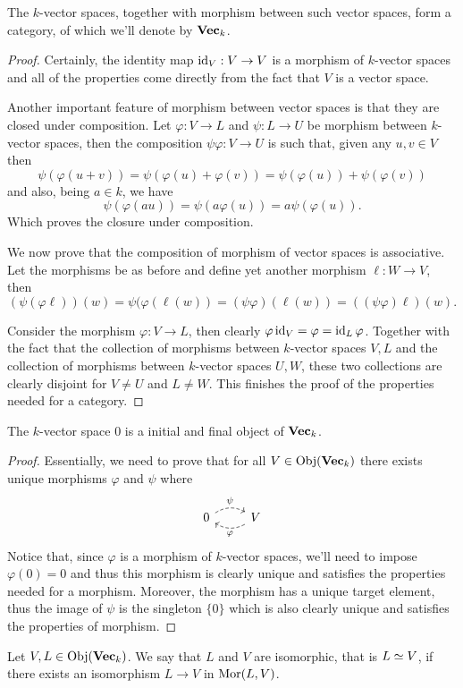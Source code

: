 \begin{proposition}\label{prop: category of vector spaces}
The \(k\)-vector spaces, together with morphism between such vector spaces,
form a category, of which we'll denote by \({\textbf{Vec}}_k\).
\end{proposition}

\begin{proof}
Certainly, the identity map \(\operatorname{id}_V : V \to V\) is a morphism of \(k\)-vector
spaces and all of the properties come directly from the fact that \(V\) is a
vector space.

Another important feature of morphism between vector spaces is that they are
closed under composition. Let \(\varphi : V \to L\) and \(\psi : L \to U\) be
morphism between \(k\)-vector spaces, then the composition \(\psi
\varphi : V \to U\) is such that, given any \(u, v \in V\) then
\[
  \psi(\varphi(u+v)) = \psi(\varphi(u) + \varphi(v)) = \psi(\varphi(u)) +
  \psi(\varphi(v))
\]
and also, being \(a \in k\), we have
\[
  \psi(\varphi(au)) = \psi(a\varphi(u)) = a \psi(\varphi(u)).
\]
Which proves the closure under composition.

We now prove that the composition of morphism of vector spaces is
associative. Let the morphisms be as before and define yet another morphism
\(\ell : W \to V\), then
\[
  (\psi  (\varphi  \ell)) (w) = \psi(\varphi(\ell(w)) = (\psi
  \varphi)(\ell(w)) = ((\psi  \varphi)  \ell) (w).
\]

Consider the morphism \(\varphi : V \to L\), then clearly \(\varphi
\operatorname{id}_V = \varphi = \operatorname{id}_L  \varphi\). Together with the fact that the
collection of morphisms between \(k\)-vector spaces \(V, L\) and the
collection of morphisms between \(k\)-vector spaces \(U, W\), these two
collections are clearly disjoint for \(V \neq U\) and \(L \neq W\). This
finishes the proof of the properties needed for a category.
\end{proof}

\begin{proposition}
The \(k \)-vector space \(0\) is a initial and final object of
\({\textbf{Vec}}_k\).
\end{proposition}

\begin{proof}
Essentially, we need to prove that for all \(V \in \operatorname{Obj}({\textbf{Vec}}_k)\) there
exists unique morphisms \(\varphi\) and \(\psi\) where
\[
  \begin{tikzcd}
    0
    \ar[r, bend left, dashed, "\psi"]
      &V
      \ar[l, bend left, dashed, "\varphi"]
  \end{tikzcd}
\]
Notice that, since \(\varphi\) is a morphism of \(k\)-vector spaces, we'll
need to impose \(\varphi(0) = 0\) and thus this morphism is clearly unique
and satisfies the properties needed for a morphism. Moreover, the morphism
has a unique target element, thus the image of \(\psi\) is the singleton
\(\{0\}\) which is also clearly unique and satisfies the properties of
morphism.
\end{proof}

\begin{definition}[Isomorphism]
Let \(V, L \in \operatorname{Obj}({\textbf{Vec}}_k)\). We say that \(L\) and \(V\) are
isomorphic, that is \(L \simeq V\), if there exists an isomorphism \(L \to V\)
in \(\operatorname{Mor}(L, V)\).
\end{definition}
